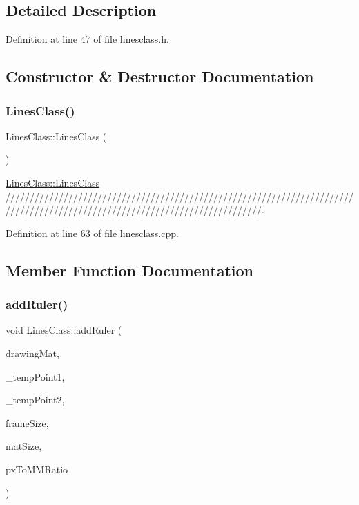 \subsection{Detailed Description}


Definition at line 47 of file linesclass.\+h.



\subsection{Constructor \& Destructor Documentation}
\mbox{\label{class_lines_class_a27cc25678359a1897ad8b29390e612cc}} 
\subsubsection{\texorpdfstring{LinesClass()}{LinesClass()}}
{\footnotesize\ttfamily Lines\+Class\+::\+Lines\+Class (\begin{DoxyParamCaption}{ }\end{DoxyParamCaption})}



\mbox{\hyperlink{class_lines_class_a27cc25678359a1897ad8b29390e612cc}{Lines\+Class\+::\+Lines\+Class}} /////////////////////////////////////////////////////////////////////////////////////////////////////////////////////////////. 



Definition at line 63 of file linesclass.\+cpp.



\subsection{Member Function Documentation}
\mbox{\label{class_lines_class_ab61cc7912d5903aec574d53847e7ebf2}} 
\subsubsection{\texorpdfstring{addRuler()}{addRuler()}}
{\footnotesize\ttfamily void Lines\+Class\+::add\+Ruler (\begin{DoxyParamCaption}\item[{Mat \&}]{drawing\+Mat,  }\item[{Q\+Point}]{\+\_\+temp\+Point1,  }\item[{Q\+Point}]{\+\_\+temp\+Point2,  }\item[{Q\+Size}]{frame\+Size,  }\item[{Q\+Size}]{mat\+Size,  }\item[{double}]{px\+To\+M\+M\+Ratio }\end{DoxyParamCaption})}



